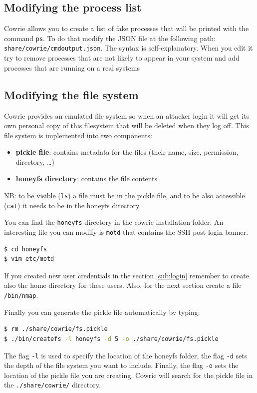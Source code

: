 \documentclass[epsfig,a4paper,11pt,titlepage,oneside,openany]{book}
\begin{document}
\subsection{Modifying the process list}
Cowrie allows you to create a list of fake processes that will be printed with the command \texttt{ps}. To do that modify the JSON file at the following path: \texttt{share/cowrie/cmdoutput.json}. The syntax is self-explanatory. When you edit it try to remove processes that are not likely to appear in your system and add processes that are running on a real systems


\subsection{Modifying the file system}
Cowrie provides an emulated file system so when an attacker login it will get its own personal copy of this filesystem that will be deleted when they log off. This file system is implemented into two components:
\begin{itemize}
\itemsep0em 
\item \textbf{pickle file}: contains metadata for the files (their name, size, permission, directory, …)
\item \textbf{honeyfs directory}: contains the file contents
\end{itemize}

\noindent NB: to be visible (\texttt{ls}) a file must be in the pickle file, and to be also accessible (\texttt{cat}) it needs to be in the honeyfs directory.

You can find the \texttt{honeyfs} directory in the cowrie installation folder. An interesting file you can modify is \texttt{motd} that contains the SSH post login banner.
\begin{lstlisting}[language=bash]
$ cd honeyfs
$ vim etc/motd
\end{lstlisting}

If you created new user credentials in the section \ref{sub:login} remember to create also the home directory for these users.
Also, for the next section create a file \texttt{/bin/nmap}.

Finally you can generate the pickle file automatically by typing:
\begin{lstlisting}[language=bash]
$ rm ./share/cowrie/fs.pickle
$ ./bin/createfs -l honeyfs -d 5 -o ./share/cowrie/fs.pickle
\end{lstlisting}
The flag \texttt{-l} is used to specify the location of the honeyfs folder, the flag \texttt{-d} sets the depth of the file system you want to include. Finally, the flag \texttt{-o} sets the location of the pickle file you are creating. Cowrie will search for the pickle file in the \texttt{./share/cowrie/} directory.
\end{document}
